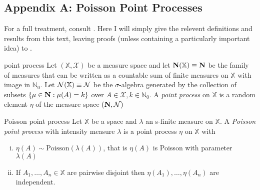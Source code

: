 \documentclass{article}
\newcounter{definitioncount} %
\newcounter{lemmacount}
\newcounter{examplecount}
\newcounter{theoremcount}
\newcounter{propositioncount}
\newcounter{corollarycount}
\newcounter{remarkcount}
\begin{document}
\setcounter{lemmacount}{1}
\setcounter{examplecount}{1}
\setcounter{theoremcount}{1}
\setcounter{propositioncount}{1}
\setcounter{corollarycount}{1}
\setcounter{remarkcount}{1}
\setcounter{definitioncount}{1}

\subsection{Appendix A: Poisson Point Processes}

For a full treatment, consult \cite{Last_Penrose_2017}. Here I will simply give the relevent definitions and 
results from this text, leaving proofs (unless containing a particularly important idea) to \cite{Last_Penrose_2017}.

\begin{definition}[]{point process}
    Let $(\mathbb{X}, \mathcal{X})$ be a measure space and let ${\bf N}(\mathbb{X}) \equiv {\bf N}$ be the family 
    of measures that can be written as a countable sum of finite measures on $\mathbb{X}$ with image in $\mathbb{N}_0$. 
    Let ${\bf \mathcal{N}}(\mathbb{X}) \equiv {\bf \mathcal{N}}$ be the $\sigma$-algebra generated by the collection 
    of subsets $\{\mu \in {\bf N} : \mu(A) = k\}$ over $A \in \mathcal{X}, k \in \mathbb{N}_0$. A {\it point process}
    on $\mathbb{X}$ is a random element $\eta$ of the measure space $({\bf N}, {\bf \mathcal{N}})$
\end{definition}

\begin{definition}[]{Poisson point process}
    Let $\mathbb{X}$ be a space and $\lambda$ an s-finite measure on $\mathbb{X}$. A {\it Poisson point process} 
    with intensity measure $\lambda$ is a point process $\eta$ on $\mathbb{X}$ with
    \begin{enumerate}[(i)]
        \item $\eta(A) \sim \text{Poisson}(\lambda(A))$, that is $\eta(A)$ is Poisson with parameter $\lambda(A)$
        \item If $A_1, \dots, A_n \in \mathbb{X}$ are pairwise disjoint then $\eta(A_1), \dots, \eta(A_n)$ 
        are independent.
    \end{enumerate}
\end{definition}

\newpage


 
\end{document}
